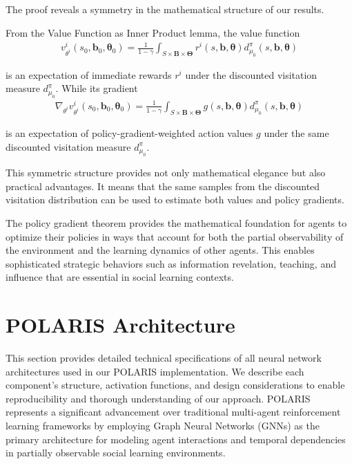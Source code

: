 The proof reveals a symmetry in the mathematical structure of our results.
\begin{remark}[Symmetry]
    From the Value Function as Inner Product lemma, the value function
    \begin{align}
        v^{i}_{\theta^i}(s_{0}, \boldsymbol{b}_{0}, \boldsymbol{\theta}_{0}) = \frac{1}{1-\gamma}\int_{S \times \boldsymbol{B} \times \boldsymbol{\Theta}}r^{i}(s, \boldsymbol{b}, \boldsymbol{\theta}) d^{\pi}_{\mu_0}(s, \boldsymbol{b}, \boldsymbol{\theta})
    \end{align}

    is an expectation of immediate rewards $r^{i}$ under the discounted visitation
    measure $d^{\pi}_{\mu_0}$. While its gradient
    \begin{align}
        \nabla_{\theta^i}v^{i}_{\theta^i}(s_{0}, \boldsymbol{b}_{0}, \boldsymbol{\theta}_{0}) = \frac{1}{1-\gamma}\int_{S \times \boldsymbol{B} \times \boldsymbol{\Theta}}g(s, \boldsymbol{b}, \boldsymbol{\theta}) d^{\pi}_{\mu_0}(s, \boldsymbol{b}, \boldsymbol{\theta})
    \end{align}

    is an expectation of policy-gradient-weighted action values $g$ under the same
    discounted visitation measure $d^{\pi}_{\mu_0}$.
\end{remark}
This symmetric structure provides not only mathematical elegance but also
practical advantages. It means that the same samples from the discounted visitation
distribution can be used to estimate both values and policy gradients.

The policy gradient theorem provides the mathematical foundation for agents to optimize
their policies in ways that account for both the partial observability of the environment
and the learning dynamics of other agents. This enables sophisticated strategic
behaviors such as information revelation, teaching, and influence that are
essential in social learning contexts.

\chapter{POLARIS Architecture}
\label{appendix:neural_architectures}

This section provides detailed technical specifications of all neural network architectures used in our POLARIS implementation. We describe each component's structure, activation functions, and design considerations to enable reproducibility and thorough understanding of our approach. POLARIS represents a significant advancement over traditional multi-agent reinforcement learning frameworks by employing Graph Neural Networks (GNNs) as the primary architecture for modeling agent interactions and temporal dependencies in partially observable social learning environments.

